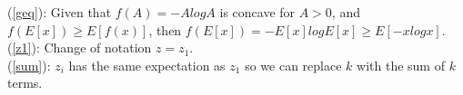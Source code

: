 \documentclass{article} %
\begin{document}
(\ref{geq}): Given that $f(A)=-AlogA$ is concave for $A>0$, and $f(E[x])\geq E[f(x)]$, then $f(E[x])=-E[x]logE[x]\geq E[-xlogx]$.\\ 
(\ref{z1}): Change of notation $z = z_1$.\\
(\ref{sum}): $z_i$ has the same expectation as $z_1$ so we can replace $k$ with the sum of $k$ terms.





\end{document}
